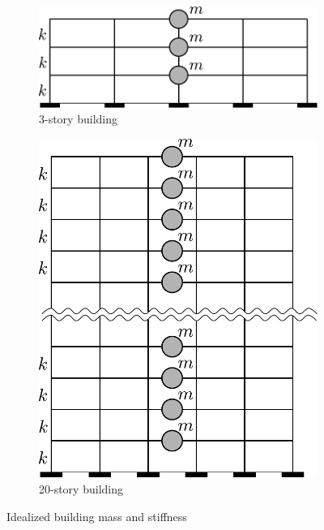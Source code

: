 \documentclass[onecolumn, fleqn]{article}
\begin{document}
\begin{figure}[H]
	\begin{subfigure}[b]{0.45\linewidth}
		\centering \includegraphics[scale=0.4]{3LA550_mass_model.pdf}
		\caption{3-story building}
	\end{subfigure}
	\begin{subfigure}[b]{0.45\linewidth}
		\centering \includegraphics[scale=0.4]{20LA550_mass_model.pdf}
		\caption{20-story building}
	\end{subfigure}
\caption{Idealized building mass and stiffness}
\label{fig:ideal_mass_stiffness}
\end{figure}
\end{document}
